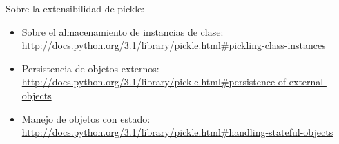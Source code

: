 Sobre la extensibilidad de pickle:

\begin{itemize}

\item Sobre el almacenamiento de instancias de clase: \newline
\href{http://docs.python.org/3.1/library/pickle.html\#pickling-class-instances}{http://docs.python.org/3.1/library/pickle.html\#pickling-class-instances}

\item Persistencia de objetos externos: \newline
\href{http://docs.python.org/3.1/library/pickle.html\#persistence-of-external-objects}{http://docs.python.org/3.1/library/pickle.html\#persistence-of-external-objects}

\item Manejo de objetos con estado: \newline
\href{http://docs.python.org/3.1/library/pickle.html\#handling-stateful-objects}{http://docs.python.org/3.1/library/pickle.html\#handling-stateful-objects}

\end{itemize}
